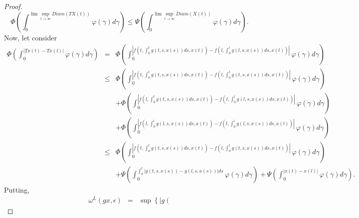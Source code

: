 \documentclass{amsart}
\theoremstyle{plain}
\numberwithin{equation}{section}
\begin{document}
\begin{proof}
\begin{equation*}
\Phi \left( \int_{0}^{\lim \sup\limits_{t\rightarrow \infty }Diam\left(
TX\left( t\right) \right) }\varphi \left( \gamma \right) d\gamma \right)
\leqslant \Psi \left( \int_{0}^{\lim \sup\limits_{t\rightarrow \infty
}Diam\left( X\left( t\right) \right) }\varphi \left( \gamma \right) d\gamma
\right) .
\end{equation*}Now, let consider\begin{eqnarray*}
\Phi \left( \int_{0}^{\left\vert Tx\left( t\right) -Tx\left( l\right)
\right\vert }\varphi \left( \gamma \right) d\gamma \right) &=&\Phi \left(
\int_{0}^{\left\vert f\left( t,\int_{0}^{t}g\left( t,s,x\left( s\right)
\right) ds,x\left( t\right) \right) -f\left( l,\int_{0}^{l}g\left(
l,s,x\left( s\right) \right) ds,x\left( l\right) \right) \right\vert
}\varphi \left( \gamma \right) d\gamma \right) \\
&\leqslant &\Phi \left( \int_{0}^{\left\vert f\left( t,\int_{0}^{t}g\left(
t,s,x\left( s\right) \right) ds,x\left( t\right) \right) -f\left(
l,\int_{0}^{t}g\left( t,s,x\left( s\right) \right) ds,x\left( t\right)
\right) \right\vert }\varphi \left( \gamma \right) d\gamma \right) \\
&&+\Phi \left( \int_{0}^{\left\vert f\left( l,\int_{0}^{t}g\left(
t,s,x\left( s\right) \right) ds,x\left( t\right) \right) -f\left(
l,\int_{0}^{l}g\left( l,s,x\left( s\right) \right) ds,x\left( t\right)
\right) \right\vert }\varphi \left( \gamma \right) d\gamma \right) \\
&&+\Phi \left( \int_{0}^{\left\vert f\left( l,\int_{0}^{l}g\left(
l,s,x\left( s\right) \right) ds,x\left( t\right) \right) -f\left(
l,\int_{0}^{l}g\left( l,s,x\left( s\right) \right) ds,x\left( l\right)
\right) \right\vert }\varphi \left( \gamma \right) d\gamma \right) \\
&\leqslant &\Phi \left( \int_{0}^{\left\vert f\left( t,\int_{0}^{t}g\left(
t,s,x\left( s\right) \right) ds,x\left( t\right) \right) -f\left(
l,\int_{0}^{t}g\left( t,s,x\left( s\right) \right) ds,x\left( t\right)
\right) \right\vert }\varphi \left( \gamma \right) d\gamma \right) \\
&&+\Psi \left( \int_{0}^{\int_{0}^{t}\left\vert g\left( t,s,x\left( s\right)
\right) -g\left( l,s,x\left( s\right) \right) \right\vert ds}\varphi \left(
\gamma \right) d\gamma \right) +\Psi \left( \int_{0}^{\left\vert x\left(
t\right) -x\left( l\right) \right\vert }\varphi \left( \gamma \right)
d\gamma \right) .
\end{eqnarray*}Putting,\begin{eqnarray*}
\omega ^{L}\left( gx,\epsilon \right) &=&\sup \left\{ \left\vert g\left(

\end{eqnarray*}
\end{proof}
\end{document}
